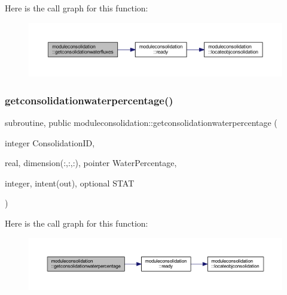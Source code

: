 Here is the call graph for this function\+:\nopagebreak
\begin{figure}[H]
\begin{center}
\leavevmode
\includegraphics[width=350pt]{namespacemoduleconsolidation_ab2cf2636db758f412f7c627b38eb6231_cgraph}
\end{center}
\end{figure}
\mbox{\label{namespacemoduleconsolidation_ab90e8e4b9e87d2f8313a0f2860b3d4c8}} 
\subsubsection{\texorpdfstring{getconsolidationwaterpercentage()}{getconsolidationwaterpercentage()}}
{\footnotesize\ttfamily subroutine, public moduleconsolidation\+::getconsolidationwaterpercentage (\begin{DoxyParamCaption}\item[{integer}]{Consolidation\+ID,  }\item[{real, dimension(\+:,\+:,\+:), pointer}]{Water\+Percentage,  }\item[{integer, intent(out), optional}]{S\+T\+AT }\end{DoxyParamCaption})}

Here is the call graph for this function\+:\nopagebreak
\begin{figure}[H]
\begin{center}
\leavevmode
\includegraphics[width=350pt]{namespacemoduleconsolidation_ab90e8e4b9e87d2f8313a0f2860b3d4c8_cgraph}
\end{center}
\end{figure}
\mbox{\label{namespacemoduleconsolidation_a26b0c6595143115c8e9db2d46e42ba05}} 
